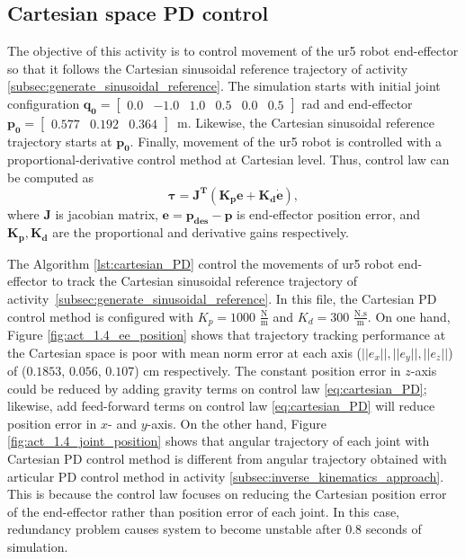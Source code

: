 \graphicspath{{images/act_1.4/}}
\subsection{Cartesian space PD control}
\label{subsec:cartesian_space_PD_control}
The objective of this activity is to control movement of the ur5 robot end-effector so that it follows the Cartesian sinusoidal reference trajectory of activity \ref{subsec:generate_sinusoidal_reference}. The simulation starts with initial joint configuration $\mathbf{q_0}=\begin{bmatrix} 0.0 & -1.0 & 1.0 & 0.5 & 0.0 & 0.5 \end{bmatrix}$ rad and end-effector $\mathbf{p_0}=\begin{bmatrix}  0.577 &   0.192 &   0.364 \end{bmatrix}$~m. Likewise, the Cartesian sinusoidal reference trajectory starts at $\mathbf{p_0}$. Finally, movement of the ur5 robot is controlled with a proportional-derivative control method at Cartesian level. Thus, control law can be computed as 
\begin{equation}
	\boldsymbol{\tau}
	= \mathbf{J^T} (\mathbf{K_p e} + \mathbf{K_d \dot{e}}),
	\label{eq:cartesian_PD}
\end{equation}
\noindent where $\mathbf{J}$ is jacobian matrix, $\mathbf{e}=\mathbf{p_{des} - p}$ is end-effector position error, and $\mathbf{K_p, K_d}$ are the proportional and derivative gains respectively. \vspace{.5cm}

The Algorithm \ref{lst:cartesian_PD} control the movements of ur5 robot end-effector to track the Cartesian sinusoidal reference trajectory of activity~\ref{subsec:generate_sinusoidal_reference}. In this file, the Cartesian PD control method is configured with ${K_{p}}=1000$ $\mathrm{\frac{N}{m}}$ and $K_{d}= 300$ $\mathrm{\frac{N.s}{m}}$. On one hand, Figure \ref{fig:act_1.4_ee_position} shows that trajectory tracking performance at the Cartesian space is poor with mean norm error at each axis ($||e_x||, ||e_y||, ||e_z||$) of ($0.1853$, $0.056$, $0.107$) cm respectively. The constant position error in $z$-axis could be reduced by adding gravity terms on control law \eqref{eq:cartesian_PD}; likewise, add feed-forward terms on control law \eqref{eq:cartesian_PD} will reduce position error in $x$- and $y$-axis. On the other hand, Figure \ref{fig:act_1.4_joint_position} shows that angular trajectory of each joint with Cartesian PD control method is different from angular trajectory obtained with articular PD control method in activity \ref{subsec:inverse_kinematics_approach}. This is because the control law focuses on reducing the Cartesian position error of the end-effector rather than position error of each joint. In this case, redundancy problem causes system to become unstable after $0.8$ seconds of simulation.  \vspace{.5cm}

